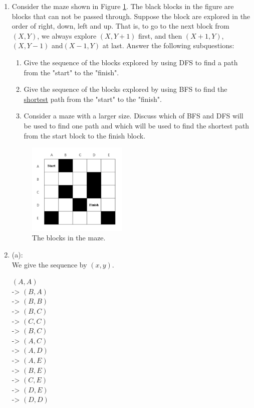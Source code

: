 \documentclass[12pt,a4paper]{article}
\makeatletter
\newtheorem*{solution}{Solution}
\theoremstyle{definition}
\renewenvironment{solution}[1][Solution] {\par\pushQED{\qed}\normalfont\topsep6\p@\@plus6\p@\relax\trivlist\item[\hskip\labelsep\bfseries#1\@addpunct{.}]\ignorespaces}{\popQED\endtrivlist\@endpefalse} \makeatother
\makeatother
\begin{document}
\begin{enumerate}
    \item Consider the maze shown in Figure \ref{Fig-Maze}. The black blocks in the figure are blocks that can not be passed through. Suppose the block are explored in the order of right, down, left and up. That is, to go to the next block from $(X,Y)$, we always explore $(X,Y+1)$ first, and then $(X+1,Y)$,$(X,Y-1)$ and$(X-1,Y)$ at last. Answer the following subquestions:
    \begin{enumerate}
        \item Give the sequence of the blocks explored by using DFS to find a path from the "start" to the "finish".
        \item Give the sequence of the blocks explored by using BFS to find the \underline{shortest} path from the "start" to the "finish".
        \item Consider a maze with a larger size. Discuss which of BFS and DFS will be used to find one path and which will be used to find the shortest path from the start block to the finish block.
    \end{enumerate}
    
    \begin{figure}[!htbp]
	\centering
	\includegraphics[width=0.45\textwidth]{Fig-Maze.pdf}
	\caption{The blocks in the maze.}
	\label{Fig-Maze}
	\end{figure}
	
	\begin{solution}
	(a):\\
	We give the sequence by $\left(x,y\right)$.
	
	        $\left( A,A \right)$\\
	     -> $\left( B,A \right)$\\
	     -> $\left( B,B \right)$\\
	     -> $\left( B,C \right)$\\
	     -> $\left( C,C \right)$\\
	     -> $\left( B,C \right)$\\
	     -> $\left( A,C \right)$\\
	     -> $\left( A,D \right)$\\
	     -> $\left( A,E \right)$\\
	     -> $\left( B,E \right)$\\
	     -> $\left( C,E \right)$\\
	     -> $\left( D,E \right)$\\
	     -> $\left( D,D \right)$\\
	    

\end{solution}
\end{enumerate}
\end{document}
